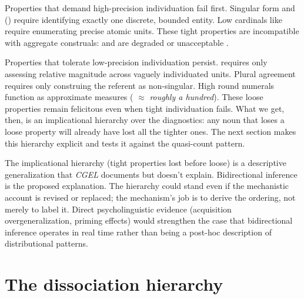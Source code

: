 \documentclass[12pt,a4paper]{article}
\begin{document}
Properties that demand high-precision individuation fail first. Singular form and () require identifying exactly one discrete, bounded entity. Low cardinals like  require enumerating precise atomic units. These tight properties are incompatible with aggregate construals:  and  are degraded or unacceptable \citep[p.~345]{huddleston2002}.

Properties that tolerate low-precision individuation persist.  requires only assessing relative magnitude across vaguely individuated units. Plural agreement requires only construing the referent as non-singular. High round numerals function as approximate measures ( $\approx$ \textit{roughly a hundred}). These loose properties remain felicitous even when tight individuation fails.
What we get, then, is an implicational hierarchy over the diagnostics: any noun that loses a loose property will already have lost all the tighter ones. The next section makes this hierarchy explicit and tests it against the quasi-count pattern.

The implicational hierarchy (tight properties lost before loose) is a descriptive generalization that \textit{CGEL} documents but doesn't explain. Bidirectional inference is the proposed explanation. The hierarchy could stand even if the mechanistic account is revised or replaced; the mechanism's job is to derive the ordering, not merely to label it. Direct psycholinguistic evidence (acquisition overgeneralization, priming effects) would strengthen the case that bidirectional inference operates in real time rather than being a post-hoc description of distributional patterns.

\section{The dissociation hierarchy}\label{sec:hierarchy}
\end{document}
